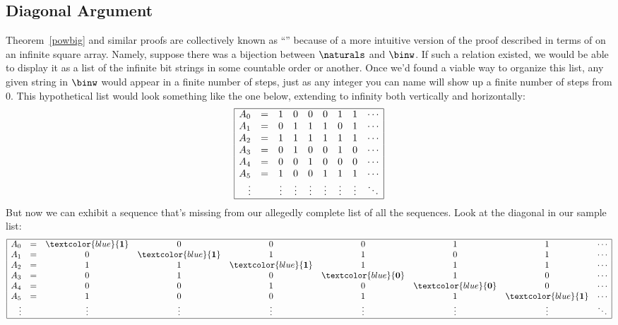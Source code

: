 \subsection{Diagonal Argument}
Theorem~\ref{powbig} and similar proofs are collectively known as
``'' because of a
more intuitive version of the proof described in terms of on an
infinite square array.  Namely, suppose there was a bijection between
$\naturals$ and $\binw$.  If such a relation existed, we would be able
to display it as a list of the infinite bit strings in some countable
order or another.  Once we'd found a viable way to organize this list,
any given string in $\binw$ would appear in a finite number of steps,
just as any integer you can name will show up a finite number of steps
from 0.  This hypothetical list would look something like the one
below, extending to infinity both vertically and horizontally:
\[\begin{array}{|rc c c c c c c l|}
\hline
A_0 &=  & 1 & 0 & 0 & 0 & 1 & 1 & \cdots\\
A_1 &=  & 0 & 1 & 1 & 1 & 0 & 1 & \cdots\\
A_2 &=  & 1 & 1 & 1 & 1 & 1 & 1 & \cdots\\
A_3 &=  & 0 & 1 & 0 & 0 & 1 & 0 & \cdots\\
A_4 &=  & 0 & 0 & 1 & 0 & 0 & 0 & \cdots\\
A_5 &=  & 1 & 0 & 0 & 1 & 1 & 1 & \cdots\\
\vdots & & \vdots & \vdots & \vdots & \vdots & \vdots &
         \vdots & \ddots\\
\hline
\end{array}\]
But now we can exhibit a sequence that's missing from our allegedly
complete list of all the sequences.  Look at the diagonal in our
sample list:
\[\begin{array}{|rc c c c c c c l|}
\hline
A_0 &=  & \textcolor{blue}{\mathbf{1}} & 0 & 0 & 0 & 1 & 1 & \cdots \\
A_1 &=  & 0 & \textcolor{blue}{\mathbf{1}} & 1 & 1 & 0 & 1 & \cdots \\
A_2 &=  & 1 & 1 & \textcolor{blue}{\mathbf{1}} & 1 & 1 & 1 & \cdots \\
A_3 &=  & 0 & 1 & 0 & \textcolor{blue}{\mathbf{0}} & 1 & 0 & \cdots \\
A_4 &=  & 0 & 0 & 1 & 0 & \textcolor{blue}{\mathbf{0}} & 0 & \cdots \\
A_5 &=  & 1 & 0 & 0 & 1 & 1 & \textcolor{blue}{\mathbf{1}} & \cdots \\
\vdots & & \vdots & \vdots & \vdots & \vdots & \vdots & \vdots & \ddots\\
\hline
\end{array}\]
